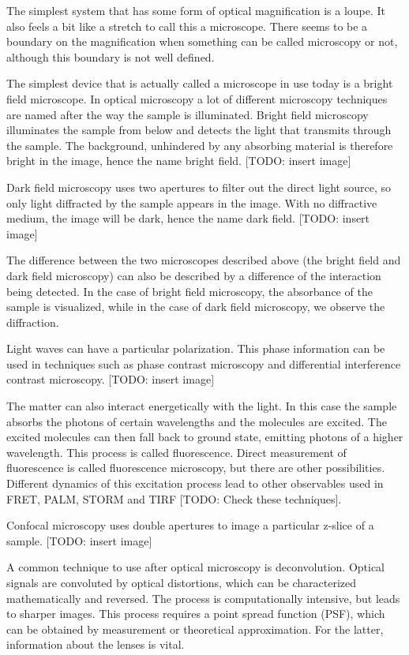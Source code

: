 The simplest system that has some form of optical magnification is a
loupe. It also feels a bit like a stretch to call this a
microscope. There seems to be a boundary on the magnification when
something can be called microscopy or not, although this boundary is
not well defined.

The simplest device that is actually called a microscope in use today
is a bright field microscope. In optical microscopy a lot of different
microscopy techniques are named after the way the sample is
illuminated. Bright field microscopy illuminates the sample from below
and detects the light that transmits through the sample. The
background, unhindered by any absorbing material is therefore bright
in the image, hence the name bright field. [TODO: insert image]

Dark field microscopy uses two apertures to filter out the direct
light source, so only light diffracted by the sample appears in the
image. With no diffractive medium, the image will be dark, hence the
name dark field. [TODO: insert image]

The difference between the two microscopes described above (the bright
field and dark field microscopy) can also be described by a difference
of the interaction being detected. In the case of bright field
microscopy, the absorbance of the sample is visualized, while in the
case of dark field microscopy, we observe the diffraction.

Light waves can have a particular polarization. This phase information
can be used in techniques such as phase contrast microscopy and
differential interference contrast microscopy. [TODO: insert image]

The matter can also interact energetically with the light. In this
case the sample absorbs the photons of certain wavelengths and the
molecules are excited. The excited molecules can then fall back to
ground state, emitting photons of a higher wavelength. This process is
called fluorescence. Direct measurement of fluorescence is called
fluorescence microscopy, but there are other possibilities. Different
dynamics of this excitation process lead to other observables used in
FRET, PALM, STORM and TIRF [TODO: Check these techniques].

Confocal microscopy uses double apertures to image a particular
z-slice of a sample. [TODO: insert image]

A common technique to use after optical microscopy is
deconvolution. Optical signals are convoluted by optical distortions,
which can be characterized mathematically and reversed. The process is
computationally intensive, but leads to sharper images. This process
requires a point spread function (PSF), which can be obtained by
measurement or theoretical approximation. For the latter, information
about the lenses is vital.

